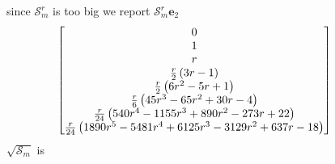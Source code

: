 since $\mathcal{S}_{m}^{r}$ is too big we report $\mathcal{S}_{m}^{r}\textbf{e}_{2}$ 
\begin{displaymath}
\hspace{-1cm}
\left[\begin{matrix} 0 \\ 1 \\ r \\ \frac{r}{2} \left(3 r - 1\right) \\ \frac{r}{2} \left(6 r^{2} - 5 r + 1\right) \\ \frac{r}{6} \left(45 r^{3} - 65 r^{2} + 30 r - 4\right) \\ \frac{r}{24} \left(540 r^{4} - 1155 r^{3} + 890 r^{2} - 273 r + 22\right) \\ \frac{r}{24} \left(1890 r^{5} - 5481 r^{4} + 6125 r^{3} - 3129 r^{2} + 637 r - 18\right) \end{matrix}\right]
\end{displaymath}
$\sqrt{\mathcal{S}_{m}}$ is
